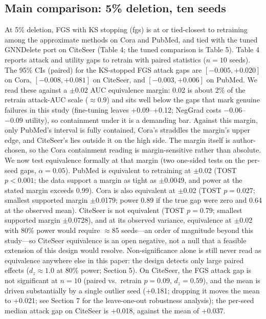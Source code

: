 \documentclass[pdflatex,sn-basic,Numbered]{sn-jnl}
\begin{document}
\subsection{Main comparison: 5\% deletion, ten seeds}
At 5\% deletion, FGS with KS stopping (fgs) is at or tied-closest to retraining among the approximate methods on Cora and PubMed, and tied with the tuned GNNDelete port on CiteSeer (Table 4; the tuned comparison is Table 5). Table 4 reports attack and utility gaps to retrain with paired statistics ($n = 10$ seeds). The 95\% CIs (paired) for the KS-stopped FGS attack gaps are $[-0.005, +0.020]$ on Cora, $[-0.008, +0.081]$ on CiteSeer, and $[-0.003, +0.006]$ on PubMed. We read these against a $\pm 0.02$ AUC equivalence margin: 0.02 is about 2\% of the retrain attack-AUC scale ($\approx 0.9$) and sits well below the gaps that mark genuine failures in this study (fine-tuning leaves +0.09--+0.12; NegGrad costs $-0.06$--$-0.09$ utility), so containment under it is a demanding bar. Against this margin, only PubMed's interval is fully contained, Cora's straddles the margin's upper edge, and CiteSeer's lies outside it on the high side. The margin itself is author-chosen, so the Cora containment reading is margin-sensitive rather than absolute. We now test equivalence formally at that margin (two one-sided tests on the per-seed gaps, $\alpha = 0.05$). PubMed is equivalent to retraining at $\pm$0.02 (TOST $p < 0.001$; the data support a margin as tight as $\pm$0.0049, and power at the stated margin exceeds 0.99). Cora is also equivalent at $\pm$0.02 (TOST $p = 0.027$; smallest supported margin $\pm$0.0179; power 0.89 if the true gap were zero and 0.64 at the observed mean). CiteSeer is not equivalent (TOST $p = 0.79$; smallest supported margin $\pm$0.0728), and at its observed variance, equivalence at $\pm$0.02 with 80\% power would require $\approx$85 seeds---an order of magnitude beyond this study---so CiteSeer equivalence is an open negative, not a null that a feasible extension of this design would resolve. Non-significance alone is still never read as equivalence anywhere else in this paper: the design detects only large paired effects ($d_z \approx 1.0$ at 80\% power; Section 5). On CiteSeer, the FGS attack gap is not significant at $n = 10$ (paired vs.\ retrain $p = 0.09$, $d_z = 0.59$), and the mean is driven substantially by a single outlier seed (+0.181; dropping it moves the mean to +0.021; see Section 7 for the leave-one-out robustness analysis); the per-seed median attack gap on CiteSeer is +0.018, against the mean of +0.037.
\end{document}
